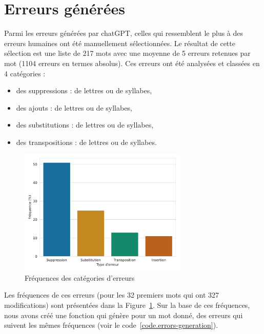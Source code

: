 \section{Erreurs générées}%
\label{sec.results.errors}

Parmi les erreurs générées par chatGPT, 
celles qui ressemblent le plus à des erreurs humaines ont été manuellement sélectionnées.
Le résultat de cette sélection est une liste de 217 mots 
avec une moyenne de 5 erreurs retenues par mot (1104 erreurs en termes absolus).
Ces erreurs ont été analysées et classées en 4 catégories :
\begin{itemize}
    \item des suppressions : de lettres ou de syllabes,
    \item des ajouts : de lettres ou de syllabes,
    \item des substitutions : de lettres ou de syllabes,
    \item des transpositions : de lettres ou de syllabes.
\end{itemize}

\begin{figure}[hbt]
    \centering
    \includegraphics[width=8cm]{assets/python/rules-stats.pdf}
    \caption{Fréquences des catégories d'erreurs}
    \label{fig.errors-freq}
\end{figure}

Les fréquences de ces erreurs (pour les 32 premiers mots qui ont 327 modifications) 
sont présentées dans la Figure~\ref{fig.errors-freq}.
Sur la base de ces fréquences, nous avons créé une fonction qui génère pour un mot donné,
des erreurs qui suivent les mêmes fréquences (voir le code~\ref{code.errors-generation}).

